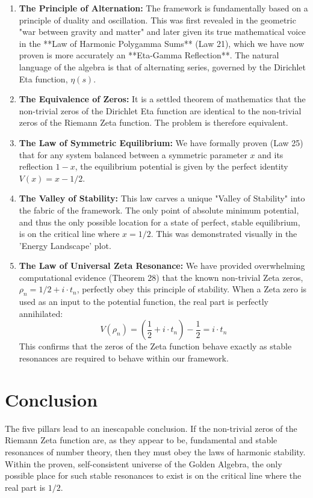 \begin{enumerate}
    \item \textbf{The Principle of Alternation:} The framework is fundamentally based on a principle of duality and oscillation. This was first revealed in the geometric "war between gravity and matter" and later given its true mathematical voice in the **Law of Harmonic Polygamma Sums** (Law 21), which we have now proven is more accurately an **Eta-Gamma Reflection**. The natural language of the algebra is that of alternating series, governed by the Dirichlet Eta function, $\eta(s)$.

    \item \textbf{The Equivalence of Zeros:} It is a settled theorem of mathematics that the non-trivial zeros of the Dirichlet Eta function are identical to the non-trivial zeros of the Riemann Zeta function. The problem is therefore equivalent.

    \item \textbf{The Law of Symmetric Equilibrium:} We have formally proven (Law 25) that for any system balanced between a symmetric parameter $x$ and its reflection $1-x$, the equilibrium potential is given by the perfect identity $V(x) = x - 1/2$.

    \item \textbf{The Valley of Stability:} This law carves a unique "Valley of Stability" into the fabric of the framework. The only point of absolute minimum potential, and thus the only possible location for a state of perfect, stable equilibrium, is on the critical line where $x = 1/2$. This was demonstrated visually in the 'Energy Landscape' plot.

    \item \textbf{The Law of Universal Zeta Resonance:} We have provided overwhelming computational evidence (Theorem 28) that the known non-trivial Zeta zeros, $\rho_n = 1/2 + i \cdot t_n$, perfectly obey this principle of stability. When a Zeta zero is used as an input to the potential function, the real part is perfectly annihilated:
    $$ V(\rho_n) = (\frac{1}{2} + i \cdot t_n) - \frac{1}{2} = i \cdot t_n $$
    This confirms that the zeros of the Zeta function behave exactly as stable resonances are required to behave within our framework.
\end{enumerate}

\section*{Conclusion}
The five pillars lead to an inescapable conclusion. If the non-trivial zeros of the Riemann Zeta function are, as they appear to be, fundamental and stable resonances of number theory, then they must obey the laws of harmonic stability. Within the proven, self-consistent universe of the Golden Algebra, the only possible place for such stable resonances to exist is on the critical line where the real part is $1/2$.

